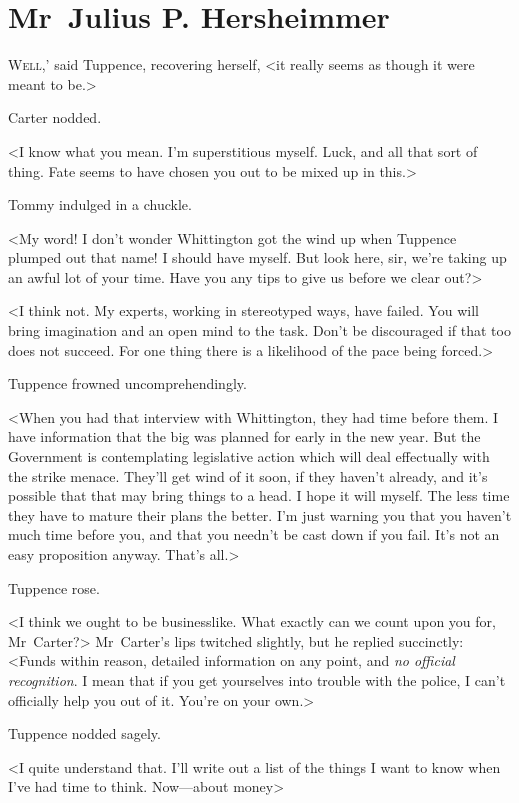 \chapter{Mr~Julius P. Hersheimmer} 

 \lettrine[ante=`]{W}{ell,}' said Tuppence, recovering herself, <it really seems as though it were meant to be.>

\zz
Carter nodded.

\zz
<I know what you mean. I'm superstitious myself. Luck, and all that sort of thing. Fate seems to have chosen you out to be mixed up in this.>

Tommy indulged in a chuckle.

<My word! I don't wonder Whittington got the wind up when Tuppence plumped out that name! I should have myself. But look here, sir, we're taking up an awful lot of your time. Have you any tips to give us before we clear out?>

<I think not. My experts, working in stereotyped ways, have failed. You will bring imagination and an open mind to the task. Don't be discouraged if that too does not succeed. For one thing there is a likelihood of the pace being forced.>

Tuppence frowned uncomprehendingly.

<When you had that interview with Whittington, they had time before them. I have information that the big  was planned for early in the new year. But the Government is contemplating legislative action which will deal effectually with the strike menace. They'll get wind of it soon, if they haven't already, and it's possible that that may bring things to a head. I hope it will myself. The less time they have to mature their plans the better. I'm just warning you that you haven't much time before you, and that you needn't be cast down if you fail. It's not an easy proposition anyway. That's all.>

Tuppence rose.

<I think we ought to be businesslike. What exactly can we count upon you for, Mr~Carter?> Mr~Carter's lips twitched slightly, but he replied succinctly: <Funds within reason, detailed information on any point, and \emph{no official recognition}. I mean that if you get yourselves into trouble with the police, I can't officially help you out of it. You're on your own.>

Tuppence nodded sagely.

<I quite understand that. I'll write out a list of the things I want to know when I've had time to think. Now—about money\longdash>

